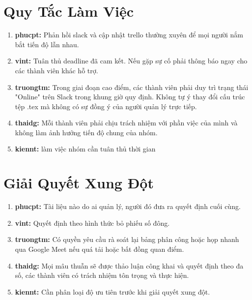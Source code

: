 \documentclass[12pt,a4paper]{article}
\begin{document}
\section{Quy Tắc Làm Việc}
\begin{enumerate}[itemsep=0pt, parsep=0pt]
    \item \textbf{phucpt:} Phản hồi slack và cập nhật trello thường xuyên để mọi người nắm bắt tiến độ lẫn nhau.
    \item \textbf{vint:} Tuân thủ deadline đã cam kết. Nếu gặp sự cố phải thông báo ngay cho các thành viên khác hỗ trợ.
    \item \textbf{truongtm:} Trong giai đoạn cao điểm, các thành viên phải duy trì trạng thái "Online" trên Slack trong khung giờ quy định. Không tự ý thay đổi cấu trúc tệp .tex mà không có sự đồng ý của người quản lý trực tiếp.
    \item \textbf{thaidg:} Mỗi thành viên phải chịu trách nhiệm với phần việc của mình và không làm ảnh hưởng tiến độ chung của nhóm.
    \item \textbf{kiennt:} làm việc nhóm cần tuân thủ thời gian
\end{enumerate}

\section{Giải Quyết Xung Đột}
\begin{enumerate}[itemsep=0pt, parsep=0pt]
    \item \textbf{phucpt:} Tài liệu nào do ai quản lý, người đó đưa ra quyết định cuối cùng.
    \item \textbf{vint:} Quyết định theo hình thức bỏ phiếu số đông.
    \item \textbf{truongtm:} Có quyền yêu cầu rà soát lại bảng phân công hoặc họp nhanh qua Google Meet nếu quá tải hoặc bất đồng quan điểm.
    \item \textbf{thaidg:} Mọi mâu thuẫn sẽ được thảo luận công khai và quyết định theo đa số, các thành viên có trách nhiệm tôn trọng và thực hiện.
    \item \textbf{kiennt:} Cần phân loại độ ưu tiên trước khi giải quyết xung đột.
\end{enumerate}
\end{document}
